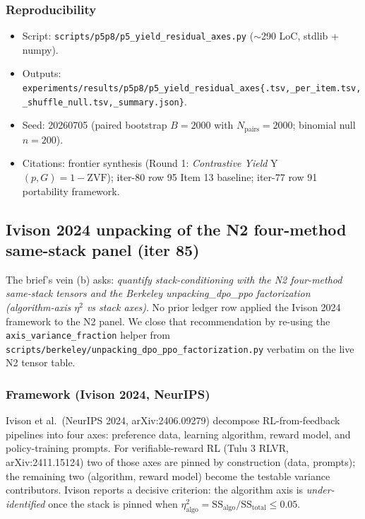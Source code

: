 \documentclass{article}  \usepackage[preprint,nonatbib]{neurips_2026} \usepackage[numbers]{natbib}
\begin{document}
\subsubsection*{Reproducibility}
\begin{itemize}
  \item Script: \texttt{scripts/p5p8/p5\_yield\_residual\_axes.py} ($\sim$290 LoC, stdlib + numpy).
  \item Outputs: \texttt{experiments/results/p5p8/p5\_yield\_residual\_axes\{.tsv,\_per\_item.tsv,\_shuffle\_null.tsv,\_summary.json\}}.
  \item Seed: 20260705 (paired bootstrap $B=2000$ with $N_{\mathrm{pairs}}=2000$; binomial null $n=200$).
  \item Citations: frontier synthesis (Round 1: \emph{Contrastive Yield} Y$(p,G)=1-\mathrm{ZVF}$); iter-80 row 95 Item 13 baseline; iter-77 row 91 portability framework.
\end{itemize}
 \subsection{Ivison 2024 unpacking of the N2 four-method same-stack panel (iter 85)}
\label{sec:p5-iter85-ivison-unpacking}

The brief's vein (b) asks: \emph{quantify stack-conditioning with the N2
four-method same-stack tensors and the Berkeley unpacking\_dpo\_ppo
factorization (algorithm-axis $\eta^2$ vs stack axes)}. No prior ledger
row applied the Ivison 2024 framework to the N2 panel. We close that
recommendation by re-using the \texttt{axis\_variance\_fraction} helper
from \texttt{scripts/berkeley/unpacking\_dpo\_ppo\_factorization.py}
verbatim on the live N2 tensor table.

\subsubsection{Framework (Ivison 2024, NeurIPS)}
\label{sec:p5-iter85-ivison-framework}
Ivison et al.~(NeurIPS 2024, arXiv:2406.09279) decompose RL-from-feedback
pipelines into four axes: preference data, learning algorithm, reward
model, and policy-training prompts. For verifiable-reward RL (Tulu 3 RLVR,
arXiv:2411.15124) two of those axes are pinned by construction (data,
prompts); the remaining two (algorithm, reward model) become the
testable variance contributors. Ivison reports a decisive criterion:
the algorithm axis is \emph{under-identified} once the stack is pinned
when $\eta^2_{\mathrm{algo}} = \mathrm{SS}_{\mathrm{algo}}/\mathrm{SS}_{\mathrm{total}}
\le 0.05$.
\end{document}
